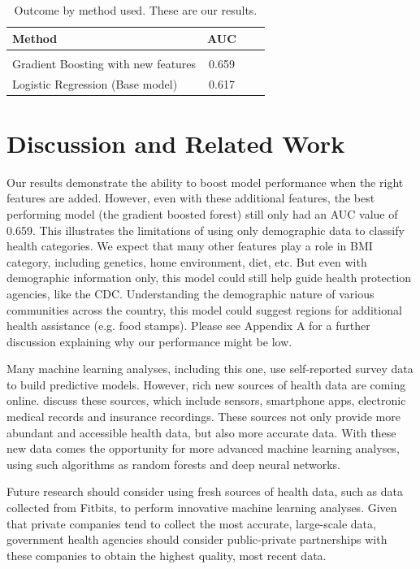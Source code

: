 \documentclass[twoside,11pt]{article}
\begin{document}
\begin{table}[h]
  \centering 
  \begin{tabular}{lclc} 
    Method & AUC \\ 
    \hline \\[-11pt]
    Gradient Boosting with new features & 0.659 \\
    Logistic Regression (Base model) & 0.617 \\ 
   \hline 
  \end{tabular}
  \label{tab:example} 
    \caption{Outcome by method used. These are our results.} 
\end{table}


\section{Discussion and Related Work} \label{discussion}
Our results demonstrate the ability to boost model performance when the right features are added. However, even with these additional features, the best performing model (the gradient boosted forest) still only had an AUC value of 0.659. This illustrates the limitations of using only demographic data to classify health categories. We expect that many other features play a role in BMI category, including genetics, home environment, diet, etc. But even with demographic information only, this model could still help guide health protection agencies, like the CDC. Understanding the demographic nature of various communities across the country, this model could suggest regions for additional health assistance (e.g. food stamps). Please see Appendix A for a further discussion explaining why our performance might be low.

Many machine learning analyses, including this one, use self-reported survey data to build predictive models. However, rich new sources of health data are coming online. \cite{degreg:18} discuss these sources, which include sensors, smartphone apps, electronic medical records and insurance recordings. These sources not only provide more abundant and accessible health data, but also more accurate data. With these new data comes the opportunity for more advanced machine learning analyses, using such algorithms as random forests and deep neural networks. 

Future research should consider using fresh sources of health data, such as data collected from Fitbits, to perform innovative machine learning analyses. Given that  private companies tend to collect the most accurate, large-scale data, government health agencies should consider public-private partnerships with these companies to obtain the highest quality, most recent data.
\end{document}
